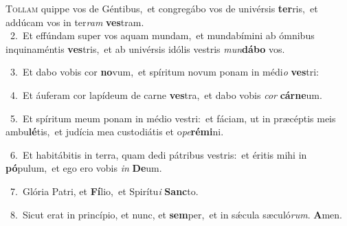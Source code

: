 \lettrine{\initial\textcolor{\initialcolor}{T}}{ollam} quippe vos de Géntibus,~\dagger et congregábo vos de univérsis \textbf{ter}\-ris,~\star et addúcam vos in ter\textit{ram} \textbf{ves}\-tram.\\
{\numbfont\textcolor{\numbcolor}{~2.}}~Et effúndam super vos aquam mundam,~\dagger et mundabímini ab ómnibus inquinaméntis \textbf{ves}\-tris,~\star et ab univérsis idólis vestris \textit{mun}\-\textbf{dá}\textbf{bo} vos.\par
{\numbfont\textcolor{\numbcolor}{~3.}}~Et dabo vobis cor \textbf{no}\-vum,~\star et spíritum novum ponam in médi\textit{o} \textbf{ves}\-tri:\par
{\numbfont\textcolor{\numbcolor}{~4.}}~Et áuferam cor lapídeum de carne \textbf{ves}\-tra,~\star et dabo vobis \textit{cor} \textbf{cár}\-\textbf{ne}um.\par
{\numbfont\textcolor{\numbcolor}{~5.}}~Et spíritum meum ponam in médio vestri:~\dagger et fáciam, ut in præcéptis meis ambu\-\textbf{lé}\-tis,~\star et judícia mea custodiátis et o\-\textit{pe}\-\textbf{ré}\textbf{mi}ni.\par
{\numbfont\textcolor{\numbcolor}{~6.}}~Et habitábitis in terra, quam dedi pátribus vestris:~\dagger et éritis mihi in \textbf{pó}\-pulum,~\star et ego ero vobis \textit{in} \textbf{De}\-um.\par
{\numbfont\textcolor{\numbcolor}{~7.}}~Glória Patri, et \textbf{Fí}\-lio,~\star et Spirítu\textit{i} \textbf{Sanc}\-to.\par
{\numbfont\textcolor{\numbcolor}{~8.}}~Sicut erat in princípio, et nunc, et \textbf{sem}\-per,~\star et in sǽcula sæculó\-\textit{rum}\-. \textbf{A}\-men.\par
